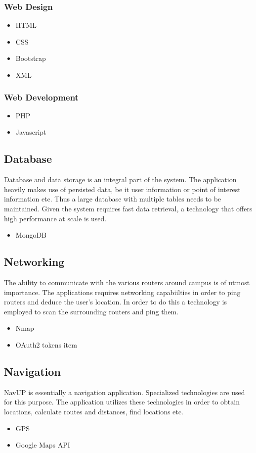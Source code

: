 \documentclass{article}
\begin{document}
		\subsubsection{Web Design}
			\begin{itemize}
				\item HTML
				\item CSS
				\item Bootstrap
				\item XML
			\end{itemize}
		\subsubsection{Web Development}
			\begin{itemize}
				\item PHP
				\item Javascript
			\end{itemize}
	\subsection{Database}
Database and data storage is an integral part of the system.  The application heavily makes use of persisted data, be it user information or point of interest information etc.  Thus a large database with multiple tables needs to be maintained.  Given the system requires fast data retrieval, a technology that offers high performance at scale is used.
		\begin{itemize}
			\item MongoDB
		\end{itemize}
	\subsection{Networking}	
The ability to communicate with the various routers around campus is of utmost importance.  The applications requires networking capabiilties in order to ping routers and deduce the user's location.  In order to do this a technology is employed to scan the surrounding routers and ping them.
		\begin{itemize}
			\item Nmap
			\item OAuth2 tokens
item
		\end{itemize}
	\subsection{Navigation}
NavUP is essentially a navigation application.  Specialized technologies are used for this purpose.  The application utilizes these technologies in order to obtain locations, calculate routes and distances, find locations etc.  
		\begin{itemize}
			\item GPS
			\item Google Maps API
		\end{itemize}
\end{document}
